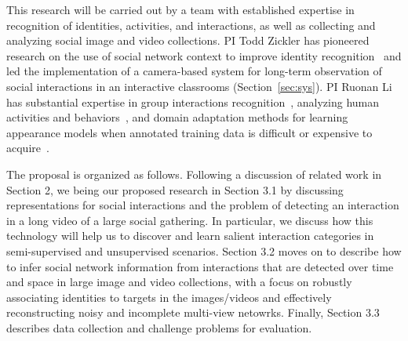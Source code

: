 This research will be carried out by a team with established expertise in recognition of identities, activities, and interactions, as well as collecting and analyzing social image and video collections. PI Todd Zickler has pioneered research on the use of social network context to improve identity recognition~\cite{Stone2008,Stone2010} and led the implementation of a camera-based system for long-term observation of social interactions in an interactive classrooms (Section~\ref{sec:sys}). PI Ruonan Li has substantial expertise in group interactions recognition~\cite{LiIJCV2012}, analyzing human activities and behaviors~\cite{Li2010,LiPAMI2012}, and domain adaptation methods for learning appearance models when annotated training data is difficult or expensive to acquire~\cite{LiZickler2012,Li2011}. 

The proposal is organized as follows. Following a discussion of related work in Section 2, we being our proposed research in Section 3.1 by discussing representations for social interactions and the problem of detecting an interaction in a long video of a large social gathering. In particular, we discuss how this technology will help us to discover and learn salient interaction categories in semi-supervised and unsupervised scenarios. Section 3.2 moves on to describe how to infer social network information from interactions that are detected over time and space in large image and video collections, with a focus on robustly associating identities to targets in the images/videos and effectively reconstructing noisy and incomplete multi-view netowrks. Finally, Section 3.3 describes data collection and challenge problems for evaluation.



